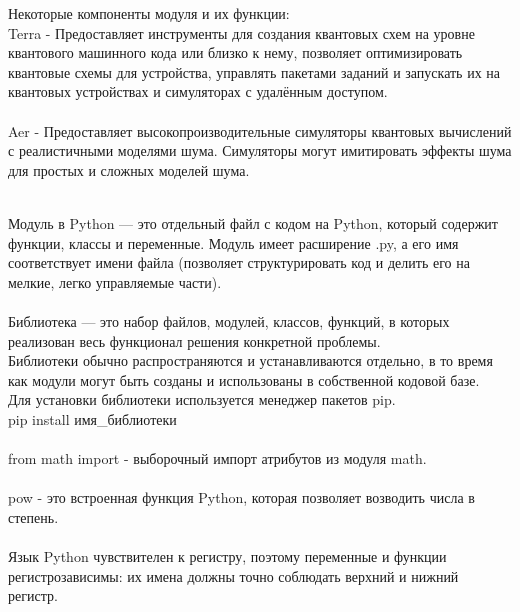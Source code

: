 \documentclass[12pt,a4paper]{article}
\begin{document}
		Некоторые компоненты модуля и их функции:\\
		Terra - Предоставляет инструменты для создания квантовых схем на уровне квантового машинного кода или близко к нему, позволяет оптимизировать квантовые схемы для устройства, управлять пакетами заданий и запускать их на квантовых устройствах и симуляторах с удалённым доступом.\\
	
		\hspace{1em}\\
		Aer - Предоставляет высокопроизводительные симуляторы квантовых вычислений с реалистичными моделями шума. Симуляторы могут имитировать эффекты шума для простых и сложных моделей шума.
	
		\hspace{1em}\\
		Модуль в Python — это отдельный файл с кодом на Python, который содержит функции, классы и переменные. Модуль имеет расширение .py, а его имя соответствует имени файла (позволяет структурировать код и делить его на мелкие, легко управляемые части).\\

		\hspace{1em}\\
		Библиотека — это набор файлов, модулей, классов, функций, в которых реализован весь функционал решения конкретной проблемы.\\
	
		Библиотеки обычно распространяются и устанавливаются отдельно, в то время как модули могут быть созданы и использованы в собственной кодовой базе.\\

		Для установки библиотеки используется менеджер пакетов pip.\\
		pip install имя\_библиотеки\\

		\hspace{1em}\\
		from math import - выборочный импорт атрибутов из модуля math.\\

		\hspace{1em}\\
		pow - это встроенная функция Python, которая позволяет возводить числа в степень.\\
		
		\hspace{1em}\\
		Язык Python чувствителен к регистру, поэтому переменные и функции регистрозависимы: их имена должны точно соблюдать верхний и нижний регистр.\\
		
\end{document}
